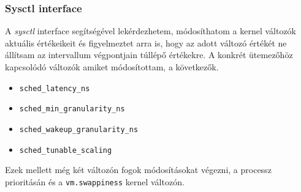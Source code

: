 \documentclass{beamer}
\begin{document}
\begin{frame}
\frametitle{Sysctl interface}
A \textit{sysctl} interface segítségével lekérdezhetem, módosíthatom a kernel változók aktuális értékeikeit és figyelmeztet arra is, hogy az adott változó értékét ne állítsam az intervallum végpontjain túllépő értékekre.
A konkrét ütemezőhöz kapcsolódó változók amiket módosítottam, a következők.

\begin{itemize}
\item \texttt{sched\_latency\_ns}
\item \texttt{sched\_min\_granularity\_ns}
\item \texttt{sched\_wakeup\_granularity\_ns}
\item \texttt{sched\_tunable\_scaling}
\end{itemize}

Ezek mellett még két változón fogok módosításokat végezni, a processz prioritásán és a \texttt{vm.swappiness} kernel változón.
\end{frame}
\end{document}
